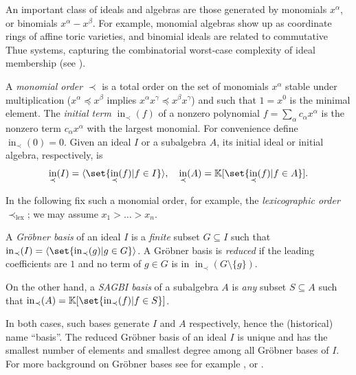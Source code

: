 \documentclass[12pt]{article}
\newcommand{\KK}{\mathbb{K}}
\DeclareMathOperator{\ini}{in}
\begin{document}
\begin{example}
An important class of ideals and algebras are those generated by monomials $x^\alpha$, or binomials $x^\alpha-x^\beta$. For example, monomial algebras show up as coordinate rings of affine toric varieties, and binomial ideals are related to commutative Thue systems, capturing the combinatorial worst-case complexity of ideal membership (see ).
\end{example}

\begin{definition}
A \emph{monomial order} $\prec$ is a total order on the set of monomials $x^\alpha$ stable under multiplication ($x^\alpha \preceq x^\beta$ implies $x^\alpha x^\gamma \preceq x^\beta x^\gamma$) and such that $1 = x^0$ is the minimal element.
The \emph{initial term} $\ini_\prec(f)$ of a nonzero polynomial $f = \sum_\alpha c_\alpha x^\alpha$ is the nonzero term $c_\alpha x^\alpha$ with the largest monomial. For convenience define $\ini_\prec(0) = 0$. Given an ideal $I$ or a subalgebra $A$, its initial ideal or initial algebra, respectively, is
\[
\ini_\prec(I) = \langle \set{\ini_\prec(f) | f \in I} \rangle, \quad \ini_\prec(A) = \KK[\set{\ini_\prec(f) | f \in A}].
\]
\end{definition}

In the following fix such a monomial order, for example, the \emph{lexicographic order} $\prec_{\text{lex}}$; we may assume $x_1>\dots>x_n$.

\begin{definition}\label{def:Groebner_SAGBI}
A \emph{Gröbner basis} of an ideal $I$ is a \emph{finite} subset $G \subseteq I$ such that $\ini_\prec(I) = \langle \set{\ini_\prec(g) | g \in G}\rangle$. A Gröbner basis is \emph{reduced} if the leading coefficients are $1$ and no term of $g \in G$ is in $\ini_\prec(G\setminus\{g\})$.

On the other hand, a \emph{SAGBI basis} of a subalgebra $A$ is \emph{any} subset $S \subseteq A$ such that $\ini_\prec(A) = \KK[\set{\ini_\prec (f) | f \in S}]$.
\end{definition}
In both cases, such bases generate $I$ and $A$ respectively, hence the (historical) name \enquote{basis}. The reduced Gröbner basis of an ideal $I$ is unique and has the smallest number of elements and smallest degree among all Gröbner bases of $I$. For more background on Gröbner bases see for example \cite[Chapter 2]{Cox2016}, \cite[Chapter 21]{Gathen2017} or \cite[Chapter 2]{Kreuzer2000}.
\end{document}
